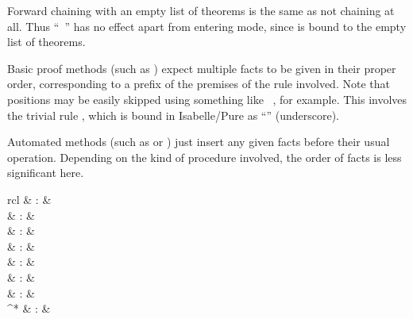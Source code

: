 \begin{isabellebody}
\begin{isamarkuptext}
\begin{descr}
  \end{descr}

  Forward chaining with an empty list of theorems is the same as not
  chaining at all.  Thus ``\mbox{}~'' has no
  effect apart from entering  mode, since
  \mbox{} is bound to the empty list of theorems.

  Basic proof methods (such as \mbox{}) expect multiple
  facts to be given in their proper order, corresponding to a prefix
  of the premises of the rule involved.  Note that positions may be
  easily skipped using something like \mbox{}~, for example.  This involves the trivial rule
  , which is bound in Isabelle/Pure as
  ``\mbox{\isa{{\isacharunderscore}}}'' (underscore).

  Automated methods (such as \mbox{} or \mbox{}) just
  insert any given facts before their usual operation.  Depending on
  the kind of procedure involved, the order of facts is less
  significant here.%
\end{isamarkuptext}%
\isamarkuptrue%
%
\isamarkuptrue%
%
\begin{isamarkuptext}%
\begin{matharray}{rcl}
     & : &  \\
     & : &  \\
     & : &  \\
     & : &  \\
     & : &  \\
     & : &  \\
     & : &  \\
    ^* & : &  \\
  \end{matharray}


\end{isamarkuptext}
\end{isabellebody}
